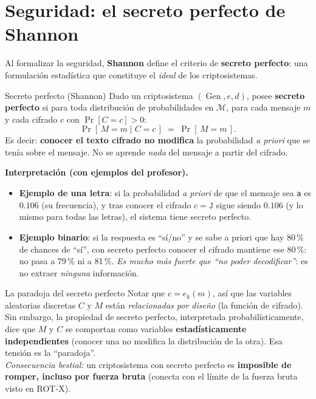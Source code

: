 \documentclass[11pt,a4paper]{article}
\newcommand{\Mset}{\mathcal{M}}
\DeclareMathOperator{\Gen}{Gen}
\begin{document}
\section{Seguridad: el secreto perfecto de Shannon}

Al formalizar la seguridad, \textbf{Shannon} define el criterio de \textbf{secreto perfecto}:
una formulación estadística que constituye el \emph{ideal} de los criptosistemas.

\begin{defbox}{Secreto perfecto (Shannon)}
Dado un criptosistema $(\Gen,e,d)$, posee \textbf{secreto perfecto} si para toda distribución
de probabilidades en $\Mset$, para cada mensaje $m$ y cada cifrado $c$ con $\Pr[C=c]>0$:
\[
  \Pr[\,M=m \mid C=c\,] \;=\; \Pr[\,M=m\,] .
\]
Es decir: \textbf{conocer el texto cifrado no modifica} la probabilidad \emph{a priori} que se
tenía sobre el mensaje. No se aprende \emph{nada} del mensaje a partir del cifrado.
\end{defbox}

\begin{notebox}
\textbf{Interpretación (con ejemplos del profesor).}
\begin{itemize}[leftmargin=1.3em,itemsep=1pt]
  \item \textbf{Ejemplo de una letra}: si la probabilidad \emph{a priori} de que el mensaje
        sea \texttt{a} es $0.106$ (su frecuencia), y tras conocer el cifrado $c=\texttt{J}$
        sigue siendo $0.106$ (y lo mismo para todas las letras), el sistema tiene secreto
        perfecto.
  \item \textbf{Ejemplo binario}: si la respuesta es ``sí/no'' y se sabe a priori que hay
        80\,\% de chances de ``sí'', con secreto perfecto conocer el cifrado mantiene ese
        80\,\%: no pasa a 79\,\% ni a 81\,\%. \emph{Es mucho más fuerte que ``no poder
        decodificar''}: es no extraer \emph{ninguna} información.
\end{itemize}
\end{notebox}

\begin{warnbox}{La paradoja del secreto perfecto}
Notar que $c=e_k(m)$, así que las variables aleatorias discretas $C$ y $M$ están
\emph{relacionadas por diseño} (la función de cifrado). Sin embargo, la propiedad de secreto
perfecto, interpretada probabilísticamente, dice que $M$ y $C$ se comportan como variables
\textbf{estadísticamente independientes} (conocer una no modifica la distribución de la otra).
Esa tensión es la ``paradoja''. \\[3pt]
\emph{Consecuencia bestial:} un criptosistema con secreto perfecto es \textbf{imposible de
romper, incluso por fuerza bruta} (conecta con el límite de la fuerza bruta visto en ROT-X).
\end{warnbox}
\end{document}
